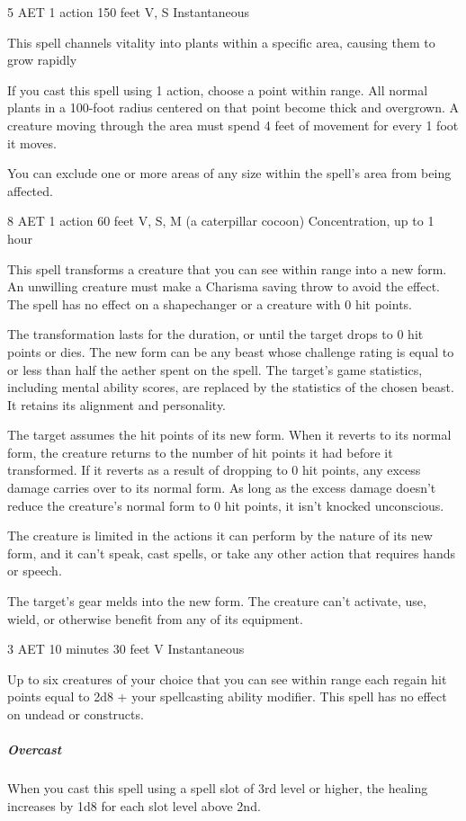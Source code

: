 \label{spell:plant-growth}
{5 AET}
{1 action}
{150 feet}
{V, S}
{Instantaneous}

This spell channels vitality into plants within a specific area, causing them to grow rapidly

If you cast this spell using 1 action, choose a point within range. All normal plants in a 100-foot radius centered on that point become thick and overgrown. A creature moving through the area must spend 4 feet of movement for every 1 foot it moves.

You can exclude one or more areas of any size within the spell's area from being affected.

\label{spell:polymorph}
{8 AET}
{1 action}
{60 feet}
{V, S, M (a caterpillar cocoon)}
{Concentration, up to 1 hour}

This spell transforms a creature that you can see within range into a new form. An unwilling creature must make a Charisma saving throw to avoid the effect. The spell has no effect on a shapechanger or a creature with 0 hit points.

The transformation lasts for the duration, or until the target drops to 0 hit points or dies. The new form can be any beast whose challenge rating is equal to or less than half the aether spent on the spell. The target's game statistics, including mental ability scores, are replaced by the statistics of the chosen beast. It retains its alignment and personality.

The target assumes the hit points of its new form. When it reverts to its normal form, the creature returns to the number of hit points it had before it transformed. If it reverts as a result of dropping to 0 hit points, any excess damage carries over to its normal form. As long as the excess damage doesn't reduce the creature's normal form to 0 hit points, it isn't knocked unconscious.

The creature is limited in the actions it can perform by the nature of its new form, and it can't speak, cast spells, or take any other action that requires hands or speech.

The target's gear melds into the new form. The creature can't activate, use, wield, or otherwise benefit from any of its equipment.

\label{spell:prayer-of-healing}
{3 AET}
{10 minutes}
{30 feet}
{V}
{Instantaneous}

Up to six creatures of your choice that you can see within range each regain hit points equal to 2d8 + your spellcasting ability modifier. This spell has no effect on undead or constructs.
\subparagraph*{Overcast} When you cast this spell using a spell slot of 3rd level or higher, the healing increases by 1d8 for each slot level above 2nd.


